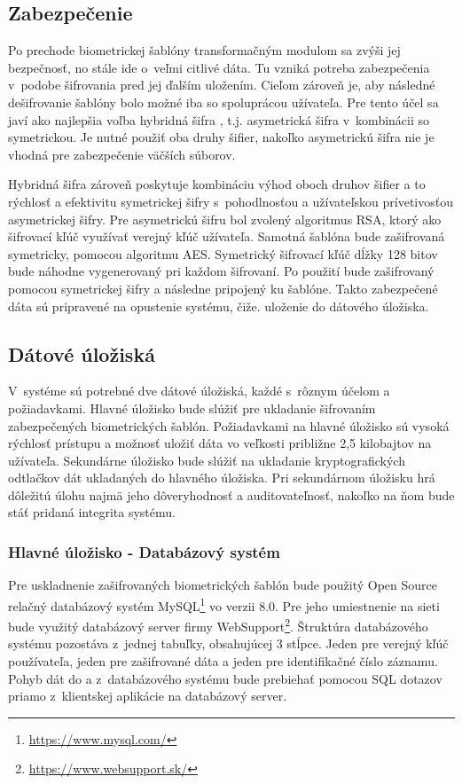 \subsection{Zabezpečenie}
Po prechode biometrickej šablóny transformačným modulom sa zvýši jej bezpečnosť, no stále ide o~veľmi citlivé dáta. Tu vzniká potreba zabezpečenia v~podobe šifrovania pred jej ďalším uložením. Cieľom zároveň je, aby následné dešifrovanie šablóny bolo možné iba so spoluprácou užívateľa. Pre tento účel sa javí ako najlepšia voľba hybridná šifra , t.j. asymetrická šifra v~kombinácii so symetrickou. Je nutné použiť oba druhy šifier, nakoľko asymetrickú šifra nie je vhodná pre zabezpečenie väčších súborov.

Hybridná šifra zároveň poskytuje kombináciu výhod oboch druhov šifier a to rýchlosť a efektivitu symetrickej šifry s~pohodlnosťou a užívateľskou prívetivosťou asymetrickej šifry. Pre asymetrickú šifru bol zvolený algoritmus RSA, ktorý ako šifrovací kľúč využívať verejný kľúč užívateľa. Samotná šablóna bude zašifrovaná symetricky, pomocou algoritmu AES. Symetrický šifrovací kľúč dĺžky 128 bitov bude náhodne vygenerovaný pri každom šifrovaní. Po použití bude zašifrovaný pomocou symetrickej šifry a následne pripojený ku šablóne. Takto zabezpečené dáta sú pripravené na opustenie systému, čiže. uloženie do dátového úložiska.


\subsection{Dátové úložiská}
V~systéme sú potrebné dve dátové úložiská, každé s~rôznym účelom a požiadavkami. Hlavné úložisko bude slúžiť pre ukladanie šifrovaním zabezpečených biometrických šablón. Požiadavkami na hlavné úložisko sú vysoká rýchlosť prístupu a možnosť uložiť dáta vo veľkosti približne 2,5 kilobajtov na užívateľa. Sekundárne úložisko bude slúžiť na ukladanie kryptografických odtlačkov dát ukladaných do hlavného úložiska. Pri sekundárnom úložisku hrá dôležitú úlohu najmä jeho dôveryhodnosť a auditovateľnosť, nakoľko na ňom bude stáť pridaná integrita systému.

\subsubsection{Hlavné úložisko - Databázový systém}
Pre uskladnenie zašifrovaných biometrických šablón bude použitý Open Source relačný databázový systém MySQL\footnote{\url{https://www.mysql.com/}} vo verzii 8.0. Pre jeho umiestnenie na sieti bude využitý databázový server firmy WebSupport\footnote{\url{https://www.websupport.sk/}}. Štruktúra databázového systému pozostáva z~jednej tabuľky, obsahujúcej 3 stĺpce. Jeden pre verejný kľúč používateľa, jeden pre zašifrované dáta a jeden pre identifikačné číslo záznamu. Pohyb dát do a z~databázového systému bude prebiehať pomocou SQL dotazov priamo z~klientskej aplikácie na databázový server.

